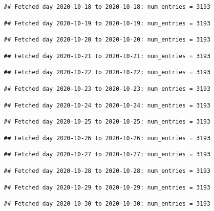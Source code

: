 \documentclass[]{article}
\begin{document}
\begin{verbatim}
## Fetched day 2020-10-18 to 2020-10-18: num_entries = 3193
\end{verbatim}

\begin{verbatim}
## Fetched day 2020-10-19 to 2020-10-19: num_entries = 3193
\end{verbatim}

\begin{verbatim}
## Fetched day 2020-10-20 to 2020-10-20: num_entries = 3193
\end{verbatim}

\begin{verbatim}
## Fetched day 2020-10-21 to 2020-10-21: num_entries = 3193
\end{verbatim}

\begin{verbatim}
## Fetched day 2020-10-22 to 2020-10-22: num_entries = 3193
\end{verbatim}

\begin{verbatim}
## Fetched day 2020-10-23 to 2020-10-23: num_entries = 3193
\end{verbatim}

\begin{verbatim}
## Fetched day 2020-10-24 to 2020-10-24: num_entries = 3193
\end{verbatim}

\begin{verbatim}
## Fetched day 2020-10-25 to 2020-10-25: num_entries = 3193
\end{verbatim}

\begin{verbatim}
## Fetched day 2020-10-26 to 2020-10-26: num_entries = 3193
\end{verbatim}

\begin{verbatim}
## Fetched day 2020-10-27 to 2020-10-27: num_entries = 3193
\end{verbatim}

\begin{verbatim}
## Fetched day 2020-10-28 to 2020-10-28: num_entries = 3193
\end{verbatim}

\begin{verbatim}
## Fetched day 2020-10-29 to 2020-10-29: num_entries = 3193
\end{verbatim}

\begin{verbatim}
## Fetched day 2020-10-30 to 2020-10-30: num_entries = 3193
\end{verbatim}
\end{document}

